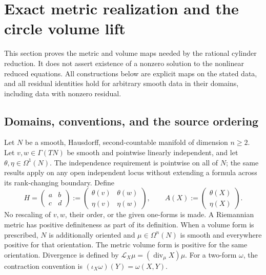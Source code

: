 \section{Exact metric realization and the circle volume lift}
\label{sec:ml-realization}

This section proves the metric and volume maps needed by the rational
cylinder reduction. It does not assert existence of a nonzero solution to
the nonlinear reduced equations. All constructions below are explicit maps
on the stated data, and all residual identities hold for arbitrary smooth
data in their domains, including data with nonzero residual.

\subsection{Domains, conventions, and the source ordering}
Let $N$ be a smooth, Hausdorff, second-countable manifold of dimension
$n\geq2$. Let $v,w\in\Gamma(TN)$ be smooth and pointwise linearly independent,
and let $\theta,\eta\in\Omega^1(N)$. The independence requirement is pointwise
on all of $N$; the same results apply on any open independent locus without
extending a formula across its rank-changing boundary. Define
\begin{equation}\label{eq:ml-H}
 H=\begin{pmatrix}a&b\\c&d\end{pmatrix}
  :=\begin{pmatrix}\theta(v)&\theta(w)\\\eta(v)&\eta(w)\end{pmatrix},
 \qquad A(X):=\begin{pmatrix}\theta(X)\\\eta(X)\end{pmatrix}.
\end{equation}
No rescaling of $v,w$, their order, or the given one-forms is made. A
Riemannian metric has positive definiteness as part of its definition.
When a volume form is prescribed, $N$ is additionally oriented and
$\mu\in\Omega^n(N)$ is smooth and everywhere positive for that orientation.
The metric volume form is positive for the same orientation. Divergence is
defined by $\mathcal L_X\mu=(\operatorname{div}_\mu X)\mu$.
For a two-form $\omega$, the contraction convention is
$(\iota_X\omega)(Y)=\omega(X,Y)$.

